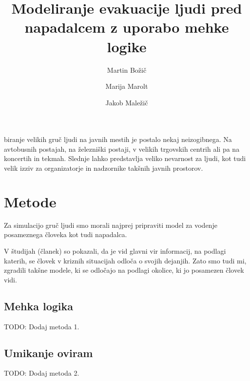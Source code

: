 \documentclass[9pt]{pnas-new}
\title{Modeliranje evakuacije ljudi pred napadalcem z uporabo mehke logike}
\author{Martin Božič}
\author{Marija Marolt}
\author{Jakob Maležič}
\affil{Poročilo seminarske naloge pri predmetu Skupinsko vedenje}
\begin{document}
\verticaladjustment{-2pt}

\maketitle
\thispagestyle{firststyle}

biranje velikih gruč ljudi na javnih mestih je postalo nekaj neizogibnega. Na avtobusnih postajah, na železniški postaji, v velikih trgovskih centrih ali pa na koncertih in tekmah. Slednje lahko predstavlja veliko nevarnost za ljudi, kot tudi velik izziv za organizatorje in nadzornike takšnih javnih prostorov.

\section*{Metode}
Za simulacijo gruč ljudi smo morali najprej pripraviti model za vodenje posameznega človeka kot tudi napadalca.

V študijah (članek) so pokazali, da je vid glavni vir informacij, na podlagi katerih, se človek v kriznih situacijah odloča o svojih dejanjih. Zato smo tudi mi, zgradili takšne modele, ki se odločajo na podlagi okolice, ki jo posamezen človek vidi.

\subsection*{Mehka logika}
TODO: Dodaj metoda 1.

\subsection*{Umikanje oviram}
TODO: Dodaj metoda 2.
\end{document}
